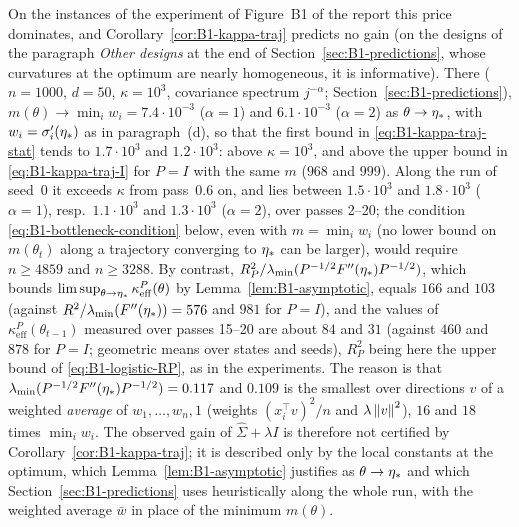 On the instances of the experiment of Figure~B1 of the report this price dominates, and
Corollary~\ref{cor:B1-kappa-traj} predicts no gain (on the designs of the paragraph \emph{Other designs} at the end of
Section~\ref{sec:B1-predictions}, whose curvatures at the optimum are nearly homogeneous, it is informative). There
($n=1000$, $d=50$, $\kappa=10^3$, covariance spectrum
$j^{-\alpha}$; Section~\ref{sec:B1-predictions}), $m(\theta)\to\min_iw_i=7.4\cdot10^{-3}$ ($\alpha=1$) and
$6.1\cdot10^{-3}$ ($\alpha=2$) as $\theta\to\eta_\ast$, with $w_i=\sigma_i'(\eta_\ast)$ as in paragraph~(d), so
that the first bound in \eqref{eq:B1-kappa-traj-stat} tends to $1.7\cdot10^3$ and $1.2\cdot10^3$: above
$\kappa=10^3$, and above the upper bound in \eqref{eq:B1-kappa-traj-I} for $P=I$ with the same $m$ ($968$ and
$999$). Along the run of seed~$0$ it exceeds $\kappa$ from pass~$0.6$ on, and lies between $1.5\cdot10^3$ and
$1.8\cdot10^3$ ($\alpha=1$), resp.\ $1.1\cdot10^3$ and $1.3\cdot10^3$ ($\alpha=2$), over passes 2--20; the
condition \eqref{eq:B1-bottleneck-condition} below, even with $m=\min_iw_i$ (no lower bound on $m(\theta_t)$
along a trajectory converging to $\eta_\ast$ can be larger), would require $n\ge4859$ and $n\ge3288$. By contrast,
$R_P^2/\lambda_{\min}(P^{-1/2}F''(\eta_\ast)P^{-1/2})$, which bounds $\limsup_{\theta\to\eta_\ast}\kappa^P_{\mathrm{eff}}(\theta)$
by Lemma~\ref{lem:B1-asymptotic}, equals $166$ and $103$ (against $R^2/\lambda_{\min}(F''(\eta_\ast))=576$ and $981$ for
$P=I$), and the values of $\kappa^P_{\mathrm{eff}}(\theta_{t-1})$ measured over passes 15--20 are about $84$
and $31$ (against $460$ and $878$ for $P=I$; geometric means over states and seeds), $R_P^2$ being here the
upper bound of
\eqref{eq:B1-logistic-RP}, as in the experiments. The reason is that
$\lambda_{\min}(P^{-1/2}F''(\eta_\ast)P^{-1/2})=0.117$ and $0.109$ is the smallest over directions $v$ of a weighted
\emph{average} of $w_1,\dots,w_n,1$ (weights $(x_i^\top v)^2/n$ and $\lambda\left\|v\right\|^2$), $16$ and $18$ times
$\min_iw_i$. The observed gain of $\hat\Sigma+\lambda I$ is therefore not certified by
Corollary~\ref{cor:B1-kappa-traj}; it is described only by the local constants at the optimum, which
Lemma~\ref{lem:B1-asymptotic} justifies as $\theta\to\eta_\ast$ and which Section~\ref{sec:B1-predictions} uses
heuristically along the whole run, with the weighted average $\bar w$ in place of the minimum $m(\theta)$.

